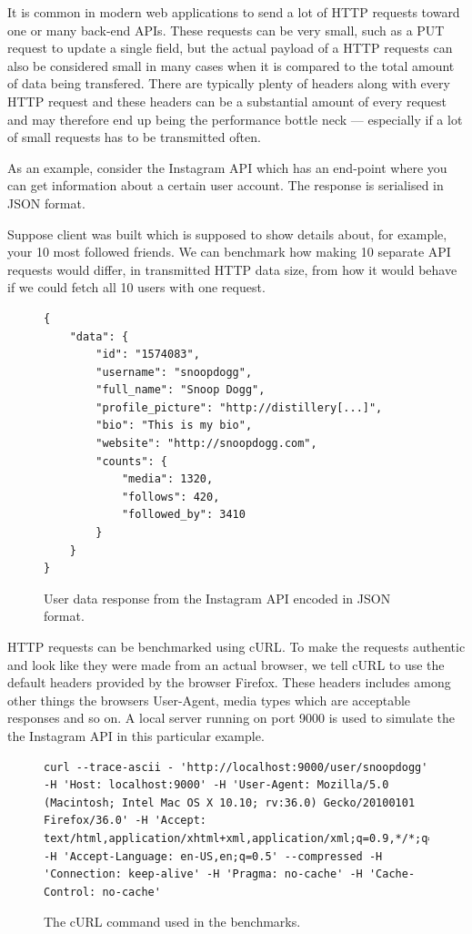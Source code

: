\documentclass{cslthse-msc}
\begin{document}
It is common in modern web applications to send a lot of HTTP requests toward one or many back-end APIs. These requests can be very small, such as a PUT request to update a single field, but the actual payload of a HTTP requests can also be considered small in many cases when it is compared to the total amount of data being transfered. There are typically plenty of headers along with every HTTP request and these headers can be a substantial amount of every request and may therefore end up being the performance bottle neck --- especially if a lot of small requests has to be transmitted often.

As an example, consider the Instagram API\cite{instagram_api} which has an end-point where you can get information about a certain user account. The response is serialised in JSON format. 

Suppose client was built which is supposed to show details about, for example, your 10 most followed friends. We can benchmark how making 10 separate API requests would differ, in transmitted HTTP data size, from how it would behave if we could fetch all 10 users with one request.

\begin{figure}[H]
  \centering
    \begin{lstlisting}
{
    "data": {
        "id": "1574083",
        "username": "snoopdogg",
        "full_name": "Snoop Dogg",
        "profile_picture": "http://distillery[...]",
        "bio": "This is my bio",
        "website": "http://snoopdogg.com",
        "counts": {
            "media": 1320,
            "follows": 420,
            "followed_by": 3410
        }
    }
}
    \end{lstlisting}
  \caption{User data response from the Instagram API encoded in JSON format.}
\end{figure}

HTTP requests can be benchmarked using cURL\cite{curl}. To make the requests authentic and look like they were made from an actual browser, we tell cURL to use the default headers provided by the browser Firefox. These headers includes among other things the browsers User-Agent, media types which are acceptable responses and so on. A local server running on port 9000 is used to simulate the the Instagram API in this particular example.

\begin{figure}[H]
  \centering
\begin{lstlisting}[breaklines=true]
curl --trace-ascii - 'http://localhost:9000/user/snoopdogg' -H 'Host: localhost:9000' -H 'User-Agent: Mozilla/5.0 (Macintosh; Intel Mac OS X 10.10; rv:36.0) Gecko/20100101 Firefox/36.0' -H 'Accept: text/html,application/xhtml+xml,application/xml;q=0.9,*/*;q=0.8' -H 'Accept-Language: en-US,en;q=0.5' --compressed -H 'Connection: keep-alive' -H 'Pragma: no-cache' -H 'Cache-Control: no-cache'
\end{lstlisting}
  \caption{The cURL command used in the benchmarks.}
\end{figure}
\end{document}
